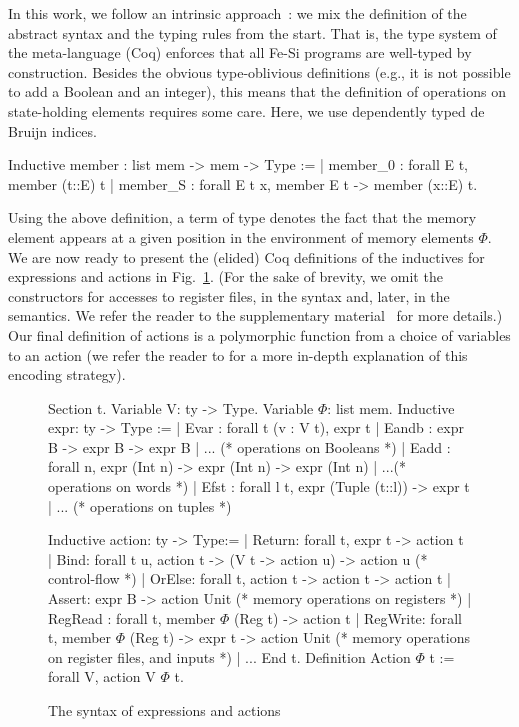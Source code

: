 \documentclass{llncs}
\begin{document}
In this work, we follow an intrinsic
approach~\cite{DBLP:journals/jar/BentonHKM12}: we mix the definition
of the abstract syntax and the typing rules from the start. That is,
the type system of the meta-language (Coq) enforces that all Fe-Si
programs are well-typed by construction.
%
Besides the obvious type-oblivious definitions (e.g., it is not
possible to add a Boolean and an integer), this means that the
definition of operations on state-holding elements requires some care.
%
Here, we use dependently typed de Bruijn indices. 
\begin{mcoq}
Inductive member : list mem -> mem ->  Type :=
| member_0 : forall E t, member (t::E) t
| member_S : forall E t x, member E t -> member (x::E) t.
\end{mcoq}
Using the above definition, a term of type  denotes
the fact that the memory element  appears at a given position
in the environment of memory elements $\Phi$. 
%
We are now ready to present the (elided) Coq definitions of the
inductives for expressions and actions in Fig.~\ref{fig:fesi}.
%
(For the sake of brevity, we omit the constructors for accesses to
register files, in the syntax and, later, in the semantics. We refer
the reader to the supplementary material~\cite{fesi} for more details.)
%
Our final definition  of actions is a polymorphic
function from a choice of variables to an action (we refer the reader
to \cite{phoas-chlipala} for a more in-depth explanation of this
encoding strategy).

\begin{figure}[t]
  \centering
\begin{coq}
Section t. 
  Variable V: ty -> Type. Variable $\Phi$: list mem. 
  Inductive expr: ty -> Type :=
  | Evar : forall t (v : V t), expr t
  | Eandb : expr B -> expr B -> expr B  | ...                      (* operations on Booleans *)
  | Eadd : forall n, expr (Int n) -> expr (Int n) -> expr (Int n)  | ...(* operations on words *)
  | Efst : forall l t, expr (Tuple (t::l)) -> expr t | ...              (* operations on tuples *) 

  Inductive action: ty -> Type:=
  | Return: forall t, expr t -> action t
  | Bind: forall t u,  action  t -> (V t -> action u) -> action u
  (* control-flow *)
  | OrElse: forall t, action t -> action t -> action t
  | Assert: expr B -> action Unit    
  (* memory operations on registers *)
  | RegRead : forall t, member $\Phi$ (Reg t) -> action t
  | RegWrite: forall t, member $\Phi$ (Reg t) -> expr t -> action Unit
  (* memory operations on register files, and inputs *)
  | ... 
End t. 
Definition Action $\Phi$ t := forall V, action V $\Phi$ t.  
\end{coq}
  \caption{The syntax of expressions and actions}
  \label{fig:fesi}
\end{figure}
\end{document}
